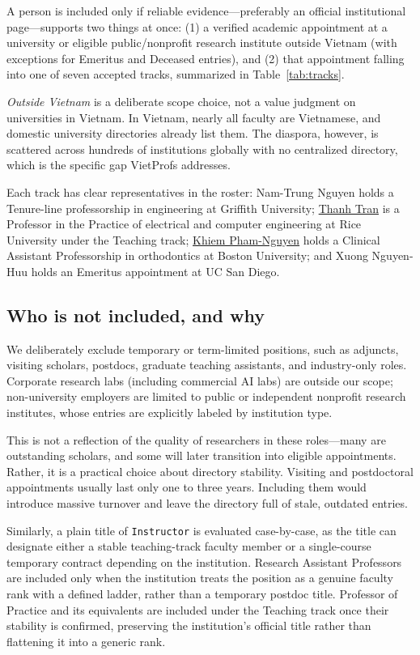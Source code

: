 \documentclass[11pt]{article}
\newcommand{\code}[1]{\texttt{\small #1}}
\newcommand{\vplink}[2]{\href{https://vietprofs.roars.dev/?q=#1}{#2}}
\begin{document}
A person is included only if reliable evidence---preferably an official institutional page---supports two things at once: (1) a verified academic appointment at a university or eligible public/nonprofit research institute outside Vietnam (with exceptions for Emeritus and Deceased entries), and (2) that appointment falling into one of seven accepted tracks, summarized in Table~\ref{tab:tracks}.

\emph{Outside Vietnam} is a deliberate scope choice, not a value judgment on universities in Vietnam. In Vietnam, nearly all faculty are Vietnamese, and domestic university directories already list them. The diaspora, however, is scattered across hundreds of institutions globally with no centralized directory, which is the specific gap VietProfs addresses.

Each track has clear representatives in the roster: Nam-Trung Nguyen holds a Tenure-line professorship in engineering at Griffith University; \vplink{Thanh+Tran}{Thanh Tran} is a Professor in the Practice of electrical and computer engineering at Rice University under the Teaching track; \vplink{Khiem+Pham-Nguyen}{Khiem Pham-Nguyen} holds a Clinical Assistant Professorship in orthodontics at Boston University; and Xuong Nguyen-Huu holds an Emeritus appointment at UC San Diego.

\subsection{Who is not included, and why}
We deliberately exclude temporary or term-limited positions, such as adjuncts, visiting scholars, postdocs, graduate teaching assistants, and industry-only roles. Corporate research labs (including commercial AI labs) are outside our scope; non-university employers are limited to public or independent nonprofit research institutes, whose entries are explicitly labeled by institution type.

This is not a reflection of the quality of researchers in these roles---many are outstanding scholars, and some will later transition into eligible appointments. Rather, it is a practical choice about directory stability. Visiting and postdoctoral appointments usually last only one to three years. Including them would introduce massive turnover and leave the directory full of stale, outdated entries.

Similarly, a plain title of \code{Instructor} is evaluated case-by-case, as the title can designate either a stable teaching-track faculty member or a single-course temporary contract depending on the institution.
Research Assistant Professors are included only when the institution treats the position as a genuine faculty rank with a defined ladder, rather than a temporary postdoc title.
Professor of Practice and its equivalents are included under the Teaching track once their stability is confirmed, preserving the institution's official title rather than flattening it into a generic rank.
\end{document}
